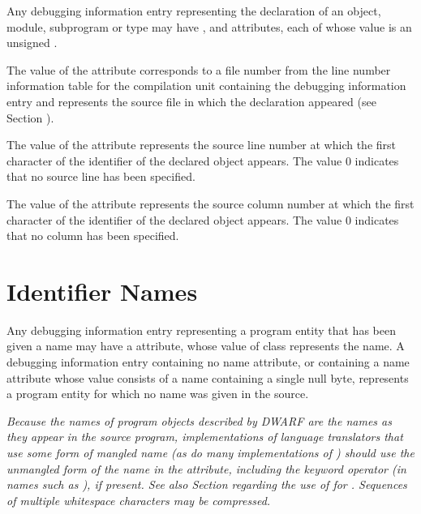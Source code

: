 Any debugging information entry representing 
the declaration of an object, module, subprogram or type may have
\DWATdeclfileDEFN,\hypertarget{chap:DWATdeclfilefilecontainingsourcedeclaration}{}
\DWATdecllineDEFN\hypertarget{chap:DWATdecllinelinenumberofsourcedeclaration}{}
 and 
\DWATdeclcolumnDEFN\hypertarget{chap:DWATdeclcolumncolumnpositionofsourcedeclaration}{}
attributes, each of whose value is an unsigned
.

The value of 
the 
\DWATdeclfile{}
attribute 
corresponds to
a file number from the line number information table for the
compilation unit containing the debugging information entry and
represents the source file in which the declaration appeared
(see Section ). 
\db

The value of 
the \DWATdeclline{} attribute represents
the source line number at which the first character of
the identifier of the declared object appears. The value 0
indicates that no source line has been specified.

The value of 
the \DWATdeclcolumn{} attribute represents
the source column number at which the first character of
the identifier of the declared object appears. The value 0
indicates that no column has been specified.

\section{Identifier Names}
\label{chap:identifiernames}
Any\hypertarget{chap:DWATnamenameofdeclaration}{}
debugging information entry 
representing 
a program entity that has been given a name may have a 
\DWATnameDEFN{} 
attribute, whose value of 
class \CLASSstring{} represents the name.
A debugging information entry containing
no name attribute, or containing a name attribute whose value
consists of a name containing a single null byte, represents
a program entity for which no name was given in the source.

\textit{Because the names of program objects described by DWARF are 
the names as they appear in the source program, implementations
of language translators that use some form of mangled name
(as do many implementations of ) should use the 
unmangled form of the name in the 
\DWATname{} attribute,
including the keyword operator (in names such as ),
if present. See also 
Section  regarding the use of 
\DWATlinkagename{} for 
.
Sequences of multiple whitespace characters may be compressed.}

